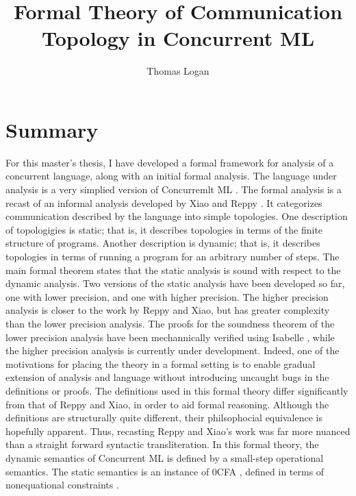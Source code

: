\documentclass{article}
\title{Formal Theory of Communication Topology in Concurrent ML}
\author{Thomas Logan}
\begin{document}
\maketitle
{}

\newpage
{}


\section{Summary}
For this master's thesis, I have developed a formal framework for analysis of
a concurrent language, along with an initial formal analysis.  The language under analysis is
a very simplied version of Concurremlt ML \cite{concurrent_ml}. The formal analysis is a
recast of an informal analysis developed by Xiao and Reppy \cite{specialization}. It
categorizes communication described by the language into simple topologies. One description of
topologigies is static; that is, it describes topologies in terms of the finite structure of
programs.  Another description is dynamic; that is, it describes topologies in terms of running
a program for an arbitrary number of steps. The main formal theorem states that the static
analysis is sound with respect to the dynamic analysis. Two versions of the static analysis
have been developed so far, one with lower precision, and one with higher precision. The higher
precision analysis is closer to the work by Reppy and Xiao, but has greater complexity than the
lower precision analysis. The proofs for the soundness theorem of the lower precision analysis
have been mechannically verified using Isabelle \cite{isabelle}, while the higher precision
analysis is currently under development. Indeed, one of the motivations for placing the theory
in a formal setting is to enable gradual extension of analysis and language without introducing
uncaught bugs in the definitions or proofs. The definitions used in this formal theory differ
significantly from that of Reppy and Xiao, in order to aid formal reasoning. Although the
definitions are structurally quite different, their philsophocial equivalence is hopefully
apparent. Thus, recasting Reppy and Xiao's work was far more nuanced than a straight forward
syntactic transliteration. In this formal theory, the dynamic semantics of Concurrent ML is
defined by a small-step operational semantics. The static semantics is an instance of 0CFA
\cite{0cfa}, defined in terms of nonequational constraints \cite{program_analysis}.
\end{document}
